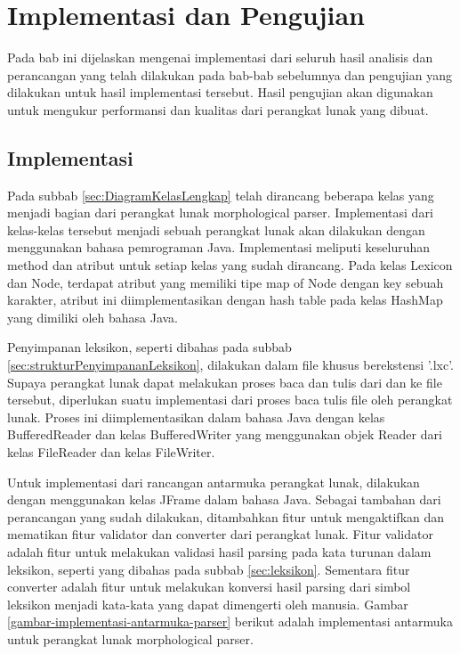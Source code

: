 \chapter{Implementasi dan Pengujian}
\label{chap:implementasiDanPengujian}

Pada bab ini dijelaskan mengenai implementasi dari seluruh hasil analisis dan perancangan yang telah dilakukan pada bab-bab sebelumnya dan pengujian yang dilakukan untuk hasil implementasi tersebut. Hasil pengujian akan digunakan untuk mengukur performansi dan kualitas dari perangkat lunak yang dibuat.

\section{Implementasi}
\label{sec:implementasi}

Pada subbab \ref{sec:DiagramKelasLengkap} telah dirancang beberapa kelas yang menjadi bagian dari perangkat lunak morphological parser. Implementasi dari kelas-kelas tersebut menjadi sebuah perangkat lunak akan dilakukan dengan menggunakan bahasa pemrograman Java. Implementasi meliputi keseluruhan method dan atribut untuk setiap kelas yang sudah dirancang. Pada kelas Lexicon dan Node, terdapat atribut yang memiliki tipe map of Node dengan key sebuah karakter, atribut ini diimplementasikan dengan hash table pada kelas HashMap yang dimiliki oleh bahasa Java.

Penyimpanan leksikon, seperti dibahas pada subbab \ref{sec:strukturPenyimpananLeksikon}, dilakukan dalam file khusus berekstensi '.lxc'. Supaya perangkat lunak dapat melakukan proses baca dan tulis dari dan ke file tersebut, diperlukan suatu implementasi dari proses baca tulis file oleh perangkat lunak. Proses ini diimplementasikan dalam bahasa Java dengan kelas BufferedReader dan kelas BufferedWriter yang menggunakan objek Reader dari kelas FileReader dan kelas FileWriter.

Untuk implementasi dari rancangan antarmuka perangkat lunak, dilakukan dengan menggunakan kelas JFrame dalam bahasa Java. Sebagai tambahan dari perancangan yang sudah dilakukan, ditambahkan fitur untuk mengaktifkan dan mematikan fitur validator dan converter dari perangkat lunak. Fitur validator adalah fitur untuk melakukan validasi hasil parsing pada kata turunan dalam leksikon, seperti yang dibahas pada subbab \ref{sec:leksikon}. Sementara fitur converter adalah fitur untuk melakukan konversi hasil parsing dari simbol leksikon menjadi kata-kata yang dapat dimengerti oleh manusia. Gambar \ref{gambar-implementasi-antarmuka-parser} berikut adalah implementasi antarmuka untuk perangkat lunak morphological parser.

